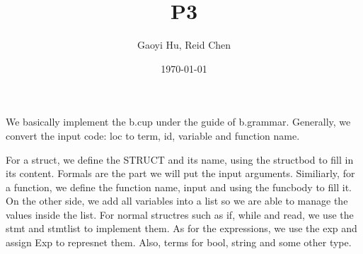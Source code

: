 \documentclass[11pt]{article}
\author{Gaoyi Hu, Reid Chen}
\date{\today}
\title{P3}
\begin{document}
\maketitle
\tableofcontents

We basically implement the b.cup under the guide of b.grammar. Generally, we convert the input code: loc to term, id, variable and function name.

For a struct, we define the STRUCT and its name, using the structbod to fill in its content. Formals are the part we will put the input arguments. Similiarly, for a function, we define the function name, input and using the funcbody to fill it. 
On the other side, we add all variables into a list so we are able to manage the values inside the list. 
For normal structres such as if, while and read, we use the stmt and stmtlist to implement them. As for the expressions, we use the exp and assign Exp to represnet them. Also, terms for bool, string and some other type. 
\end{document}
